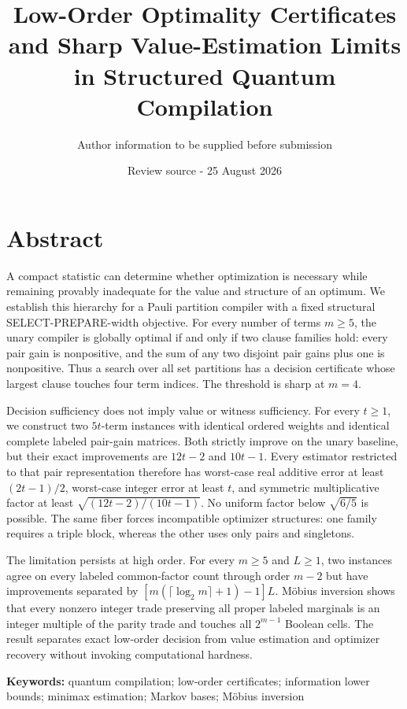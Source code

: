 \documentclass[
  11pt,
]{article}
\title{Low-Order Optimality Certificates and Sharp Value-Estimation Limits in Structured Quantum Compilation}
\author{Author information to be supplied before submission}
\date{Review source - 25 August 2026}
\begin{document}
\maketitle

\hypertarget{abstract}{%
\section{Abstract}\label{abstract}}

A compact statistic can determine whether optimization is necessary
while remaining provably inadequate for the value and structure of an
optimum. We establish this hierarchy for a Pauli partition compiler with
a fixed structural SELECT-PREPARE-width objective. For every number of
terms \(m\ge5\), the unary compiler is globally optimal if and only if
two clause families hold: every pair gain is nonpositive, and the sum of
any two disjoint pair gains plus one is nonpositive. Thus a search over
all set partitions has a decision certificate whose largest clause
touches four term indices. The threshold is sharp at \(m=4\).

Decision sufficiency does not imply value or witness sufficiency. For
every \(t\ge1\), we construct two \(5t\)-term instances with identical
ordered weights and identical complete labeled pair-gain matrices. Both
strictly improve on the unary baseline, but their exact improvements are
\(12t-2\) and \(10t-1\). Every estimator restricted to that pair
representation therefore has worst-case real additive error at least
\((2t-1)/2\), worst-case integer error at least \(t\), and symmetric
multiplicative factor at least \(\sqrt{(12t-2)/(10t-1)}\). No uniform
factor below \(\sqrt{6/5}\) is possible. The same fiber forces
incompatible optimizer structures: one family requires a triple block,
whereas the other uses only pairs and singletons.

The limitation persists at high order. For every \(m\ge5\) and
\(L\ge1\), two instances agree on every labeled common-factor count
through order \(m-2\) but have improvements separated by
\([m(\lceil\log_2m\rceil+1)-1]L\). Möbius inversion shows that every
nonzero integer trade preserving all proper labeled marginals is an
integer multiple of the parity trade and touches all \(2^{m-1}\) Boolean
cells. The result separates exact low-order decision from value
estimation and optimizer recovery without invoking computational
hardness.

\textbf{Keywords:} quantum compilation; low-order certificates;
information lower bounds; minimax estimation; Markov bases; Möbius
inversion
\end{document}

